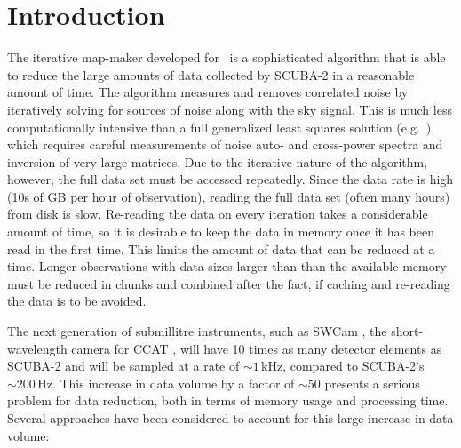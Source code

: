 \documentclass[oneside,11pt]{starlink}
\begin{document}
\scfrontmatter

\section{Introduction\label{se:intro}}

The iterative map-maker developed for \SMURF\ is a sophisticated
algorithm that is able to reduce the large amounts of data collected
by SCUBA-2 in a reasonable amount of time. The algorithm measures and
removes correlated noise by iteratively solving for sources of noise
along with the sky signal. This is much less computationally intensive
than a full generalized least squares solution
(e.g.\ \cite{patanchon2008}), which requires careful measurements of
noise auto- and cross-power spectra and inversion of very large
matrices. Due to the iterative nature of the algorithm, however, the
full data set must be accessed repeatedly. Since the data rate is high
(10s of GB per hour of observation), reading the full data set (often
many hours) from disk is slow. Re-reading the data on every iteration
takes a considerable amount of time, so it is desirable to keep the
data in memory once it has been read in the first time. This limits
the amount of data that can be reduced at a time. Longer observations
with data sizes larger than than the available memory must be reduced
in chunks and combined after the fact, if caching and re-reading the
data is to be avoided.

The next generation of submillitre instruments, such as SWCam
\cite{stacey2014}, the short-wavelength camera for CCAT
\cite{jenness2014}, will have 10 times as many detector elements as
SCUBA-2 and will be sampled at a rate of ${\sim} 1$\,kHz, compared to
SCUBA-2's ${\sim} 200$\,Hz. This increase in data volume by a factor
of ${\sim} 50$ presents a serious problem for data reduction, both
in terms of memory usage and processing time. Several approaches have
been considered to account for this large increase in data volume:
\end{document}
